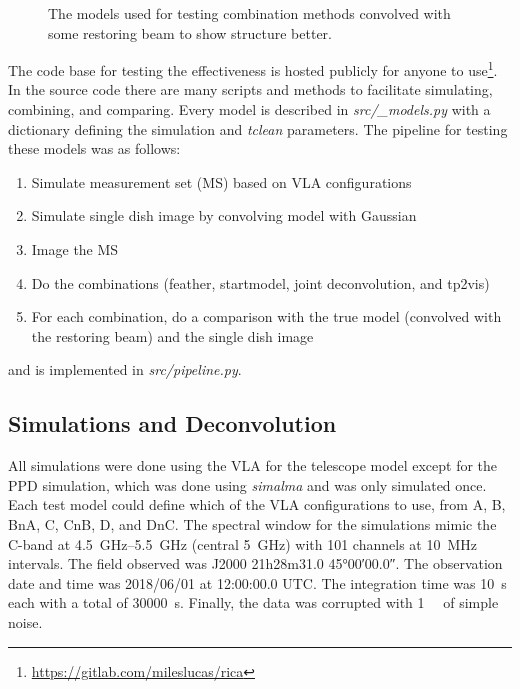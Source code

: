 \documentclass[manuscript,linenumbers]{aastex62}
\begin{document}
\begin{figure}[t]
    \caption{The models used for testing combination methods convolved with some restoring beam to show structure better.}
    \label{fig:models}
\end{figure}

The code base for testing the effectiveness is hosted publicly for anyone to use\footnote{\url{https://gitlab.com/mileslucas/rica}}. In the source code there are many scripts and methods to facilitate simulating, combining, and comparing. Every model is described in \textit{src/\_models.py} with a dictionary defining the simulation and \textit{tclean} parameters. The pipeline for testing these models was as follows:
\begin{enumerate}
    \item Simulate measurement set (MS) based on VLA configurations
    \item Simulate single dish image by convolving model with Gaussian
    \item Image the MS 
    \item Do the combinations (feather, startmodel, joint deconvolution, and tp2vis)
    \item For each combination, do a comparison with the true model (convolved with the restoring beam) and the single dish image
\end{enumerate}
and is implemented in \textit{src/pipeline.py}. 

\subsection{Simulations and Deconvolution}
All simulations were done using the VLA for the telescope model except for the PPD simulation, which was done using \textit{simalma} and was only simulated once. Each test model could define which of the VLA configurations to use, from A, B, BnA, C, CnB, D, and DnC. The spectral window for the simulations mimic the C-band at \SIrange{4.5}{5.5}{\giga\hertz} (central \SI{5}{\giga\hertz}) with 101 channels at \SI{10}{\mega\hertz} intervals. The field observed was J2000 21h28m31.0 \ang{45;00;00.0}. The observation date and time was 2018/06/01 at 12:00:00.0 UTC. The integration time was \SI{10}{\second} each with a total of \SI{30000}{\second}. Finally, the data was corrupted with \SI{1}{\milli\jansky} of simple noise.
\end{document}

